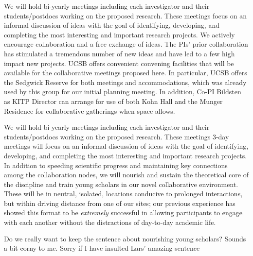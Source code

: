 {\color{green} We will hold bi-yearly meetings including each investigator and their students/postdocs working on the proposed research. These meetings focus on an informal discussion of ideas with the goal of identifying, developing, and completing the most interesting and important research projects. We actively encourage collaboration and a free exchange of ideas. The PIs' prior collaboration has stimulated a tremendous number of new ideas and have led to a few high impact new projects. UCSB offers convenient convening facilities that will be available for the collaborative meetings proposed here. In particular, UCSB offers the Sedgwick Reserve for both meetings and accommodations, which was already used by this group for our initial planning meeting. In addition, Co-PI Bildsten as KITP Director can arrange for use of both Kohn Hall and the Munger Residence for collaborative gatherings when space allows.}

We will hold bi-yearly meetings including each investigator and their students/postdocs working on the proposed research. These meetings 3-day meetings will focus on an informal discussion of ideas with the goal of identifying, developing, and completing the most interesting and important research projects. In addition to speeding scientific progress and maintaining key connections among the collaboration nodes, we will nourish and sustain the theoretical core of the discipline and train young scholars in our novel collaborative environment. These will be in neutral, isolated, locations conducive to prolonged interactions, but within driving distance from one of our sites; our previous experience has showed this format to be \emph{extremely} successful in allowing participants to engage with each another without the distractions of day-to-day academic life. 

{\color{blue} Do we really want to keep the sentence about nourishing young scholars? Sounds a bit corny to me. Sorry if I have insulted Lars' amazing sentence}
